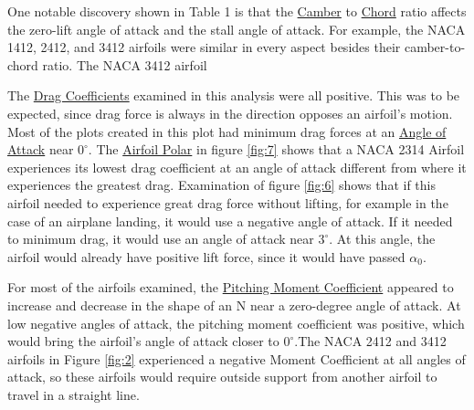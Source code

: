 \documentclass{article}
\begin{document}
One notable discovery shown in Table 1 is that the \hyperlink{Camber}{Camber} to \hyperlink{c}{Chord} ratio affects the zero-lift angle of attack and the stall angle of attack. For example, the NACA 1412, 2412, and 3412 airfoils were similar in every aspect besides their camber-to-chord ratio. The NACA 3412 airfoil 

The \hyperlink{CD}{Drag Coefficients} examined in this analysis were all positive. This was to be expected, since drag force is always in the direction opposes an airfoil's motion. Most of the plots created in this plot had minimum drag forces at an \hyperlink{alpha}{Angle of Attack} near $0^{\circ}$. The \hyperlink{AP}{Airfoil Polar} in figure \ref{fig:7} shows that a NACA 2314 Airfoil experiences its lowest drag coefficient at an angle of attack different from where it experiences the greatest drag. Examination of figure \ref{fig:6} shows that if this airfoil needed to experience great drag force without lifting, for example in the case of an airplane landing, it would use a negative angle of attack. If it needed to minimum drag, it would use an angle of attack near $3^{\circ}$. At this angle, the airfoil would already have positive lift force, since it would have passed $\alpha_{0}$. \newline

For most of the airfoils examined, the \hyperlink{CM}{Pitching Moment Coefficient} appeared to increase and decrease in the shape of an N near a zero-degree angle of attack. At low negative angles of attack, the pitching moment coefficient was positive, which would bring the airfoil's angle of attack closer to $0^{\circ}$.The NACA 2412 and 3412 airfoils in Figure \ref{fig:2} experienced a negative Moment Coefficient at all angles of attack, so these airfoils would require outside support from another airfoil to travel in a straight line.\newline
\end{document}
